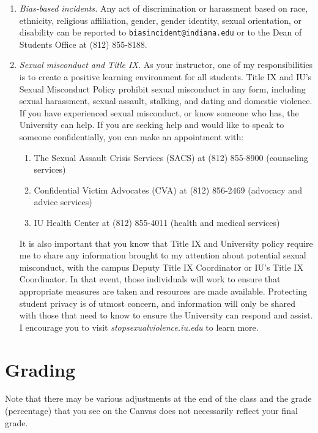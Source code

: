 \documentclass[11pt,article,oneside]{memoir} %
\begin{document}
\begin{enumerate}
\item \emph{Bias-based incidents.} Any act of discrimination or harassment based on 
race, ethnicity, religious affiliation, gender, gender identity, sexual orientation, or
disability can be reported to \texttt{biasincident@indiana.edu} or to the Dean of Students Office at (812) 855-8188. 

\item \emph{Sexual misconduct and Title IX.} As your instructor, one of my
responsibilities is to create a positive learning environment for all students.
Title IX and IU's Sexual Misconduct Policy prohibit sexual misconduct in any
form, including sexual harassment, sexual assault, stalking, and dating and
domestic violence.  If you have experienced sexual misconduct, or know someone
who has, the University can help. If you are seeking help and would like to
speak to someone confidentially, you can make an appointment with:

\begin{enumerate}

\item The Sexual Assault Crisis Services (SACS) at (812) 855-8900 (counseling services)
\item Confidential Victim Advocates (CVA) at (812) 856-2469 (advocacy and advice services)
\item IU Health Center at (812) 855-4011 (health and medical services)

\end{enumerate}

It is also important that you know that Title IX and University policy require
me to share any information brought to my attention about potential sexual
misconduct, with the campus Deputy Title IX Coordinator or IU's Title IX
Coordinator. In that event, those individuals will work to ensure that
appropriate measures are taken and resources are made available. Protecting
student privacy is of utmost concern, and information will only be shared with
those that need to know to ensure the University can respond and assist. I
encourage you to visit \emph{stopsexualviolence.iu.edu} to learn more.


\end{enumerate}
\section{Grading}\label{sec:grading_tentative_} %

Note that there may be various adjustments at the end of the class and the grade (percentage) that you see on the Canvas does not necessarily reflect your final grade.
\end{document}
